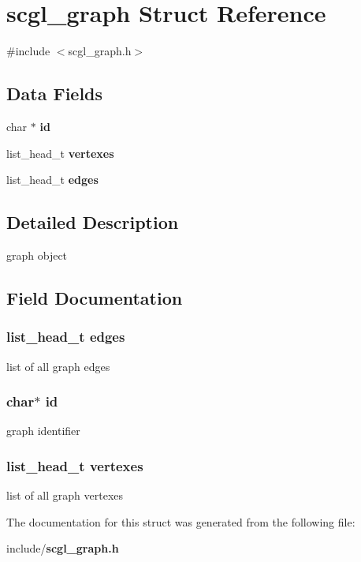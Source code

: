 \section{scgl\-\_\-graph Struct Reference}
\label{structscgl__graph}


{\ttfamily \#include $<$scgl\-\_\-graph.\-h$>$}

\subsection*{Data Fields}
\begin{DoxyCompactItemize}
\item 
char $\ast$ {\bf id}
\item 
list\-\_\-head\-\_\-t {\bf vertexes}
\item 
list\-\_\-head\-\_\-t {\bf edges}
\end{DoxyCompactItemize}


\subsection{Detailed Description}
graph object 

\subsection{Field Documentation}
\subsubsection[{edges}]{\setlength{\rightskip}{0pt plus 5cm}list\-\_\-head\-\_\-t {\bf edges}}\label{structscgl__graph_a4d1e5bb40a5518b3bc79f44b9f0d1405}
list of all graph edges 
\subsubsection[{id}]{\setlength{\rightskip}{0pt plus 5cm}char$\ast$ {\bf id}}\label{structscgl__graph_aecb3b0d045ada529257a2fbf8f829599}
graph identifier 
\subsubsection[{vertexes}]{\setlength{\rightskip}{0pt plus 5cm}list\-\_\-head\-\_\-t {\bf vertexes}}\label{structscgl__graph_a435d15dcae44f06fafcde1eb2e64fc7f}
list of all graph vertexes 

The documentation for this struct was generated from the following file\-:\begin{DoxyCompactItemize}
\item 
include/{\bf scgl\-\_\-graph.\-h}\end{DoxyCompactItemize}
